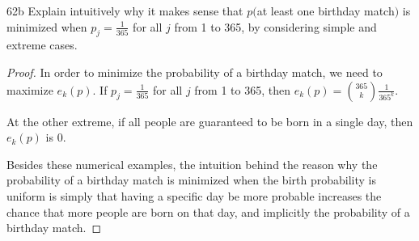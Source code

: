 \begin{exercise}{62b}
    Explain intuitively why it makes sense that $p($at least one birthday match$)$ is minimized when $p_j = \frac{1}{365}$ for all $j$ from 1 to 365, by considering simple and extreme cases.
\end{exercise}

\begin{proof}
    In order to minimize the probability of a birthday match, we need to maximize $e_k(p)$. If $p_j = \frac{1}{365}$ for all $j$ from 1 to 365, then $e_k(p) = {365 \choose k} \frac{1}{365^k}$.

    At the other extreme, if all people are guaranteed to be born in a single day, then $e_k(p)$ is 0.

    Besides these numerical examples, the intuition behind the reason why the probability of a birthday match is minimized when the birth probability is uniform is simply that having a specific day be more probable increases the chance that more people are born on that day, and implicitly the probability of a birthday match.
\end{proof}

\newpage

